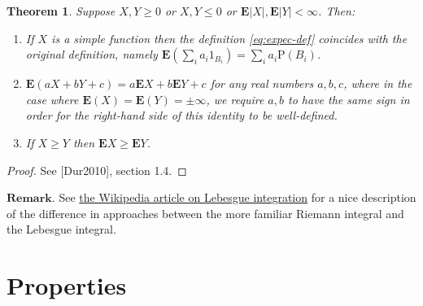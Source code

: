 \documentclass[11pt]{report}
\theoremstyle{plain}
\newtheorem{thm}{Theorem}[chapter]
\theoremstyle{definition}
\begin{document}
\begin{thm}
Suppose $X,Y\ge 0$ or $X,Y\le 0$ or
$\mathbf{E} |X|, \mathbf{E}|Y|<\infty$. Then:

\begin{enumerate}[label=\arabic*.]
\item If $X$ is a simple function then the definition
\eqref{eq:expec-def} coincides with the original
definition, namely
$\mathbf{E}(\sum_i a_i 1_{B_i}) = \sum_i a_i
\mathrm{P}(B_i)$.

\item $\mathbf{E}(aX+bY+c)=a\mathbf{E} X + b\mathbf{E} Y+c$
for any real numbers $a,b,c$, where in the case where
$\mathbf{E}(X)=\mathbf{E}(Y) = \pm \infty$, we
require $a,b$ to have the same sign in order for the
right-hand side of this identity to be well-defined.

\item If $X\ge Y$ then $\mathbf{E} X\ge \mathbf{E} Y$.
\end{enumerate}

\end{thm}

\begin{proof}
See [Dur2010], section 1.4.
\end{proof}

\noindent $\textbf{Remark.}$ See \href{http://en.wikipedia.org/wiki/Lebesgue_integration\#Intuitive_interpretation}{the Wikipedia article on
Lebesgue
integration}
for a nice description of the difference in approaches
between the more familiar Riemann integral and the
Lebesgue integral.

\section{Properties}
\label{sec-expec-prop}
\end{document}
